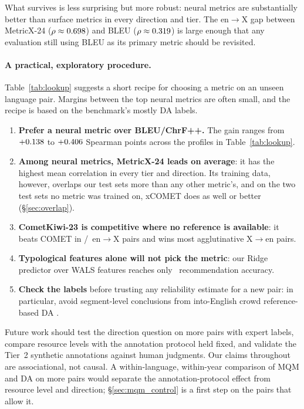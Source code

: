 \documentclass[11pt]{article}
\begin{document}
What survives is less surprising but more robust: neural metrics are substantially better than surface metrics in every direction and tier. The en$\to$X gap between MetricX-24 ($\rho\approx0.698$) and BLEU ($\rho\approx0.319$) is large enough that any evaluation still using BLEU as its primary metric should be revisited.

\paragraph{A practical, exploratory procedure.} Table~\ref{tab:lookup} suggests a short recipe for choosing a metric on an unseen language pair. Margins between the top neural metrics are often small, and the recipe is based on the benchmark's mostly DA labels.
\begin{enumerate}
  \item \textbf{Prefer a neural metric over BLEU/ChrF++.} The gain ranges from $+0.138$ to $+0.406$ Spearman points across the profiles in Table~\ref{tab:lookup}.
  \item \textbf{Among neural metrics, MetricX-24 leads on average}: it has the highest mean correlation in every tier and direction. Its training data, however, overlaps our test sets more than any other metric's, and on the two test sets no metric was trained on, xCOMET does as well or better (\S\ref{sec:overlap}).
  \item \textbf{CometKiwi-23 is competitive where no reference is available}: it beats COMET in \BeatsCometEntoXTotal/\EntoXTotalPairs\ en$\to$X pairs and wins most agglutinative X$\to$en pairs.
  \item \textbf{Typological features alone will not pick the metric}: our Ridge predictor over WALS \citep{wals} features reaches only \RidgeRecAcc\ recommendation accuracy.
  \item \textbf{Check the labels} before trusting any reliability estimate for a new pair: in particular, avoid segment-level conclusions from into-English crowd reference-based DA \citep{freitag2022results}.
\end{enumerate}

Future work should test the direction question on more pairs with expert labels, compare resource levels with the annotation protocol held fixed, and validate the Tier~2 synthetic annotations against human judgments. Our claims throughout are associational, not causal. A within-language, within-year comparison of MQM and DA on more pairs would separate the annotation-protocol effect from resource level and direction; \S\ref{sec:mqm_control} is a first step on the pairs that allow it.
\end{document}
